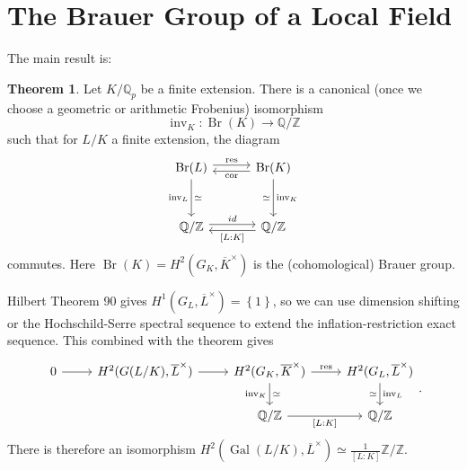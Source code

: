 \documentclass[class=article, crop=false]{standalone}
\newcommand{\ZZ}{\mathbb{Z}}
\newcommand{\QQ}{\mathbb{Q}}
\newcommand{\Gal}{\operatorname{Gal}}
\newcommand{\res}{\operatorname{res}}
\newcommand{\cor}{\operatorname{cor}}
\newcommand{\inv}{\operatorname{inv}}
\newcommand{\Br}{\operatorname{Br}}
\theoremstyle{definition}
\newtheorem{theorem}{Theorem}[section]
\begin{document}
\section{The Brauer Group of a Local Field}
The main result is:
\begin{theorem}
	Let $K/\QQ_p$ be a finite extension. There is a canonical (once we choose a geometric or arithmetic Frobenius) isomorphism
	\[
		\inv_K:\Br(K)\to\QQ/\ZZ
	\] 
	such that for $L/K$ a finite extension, the diagram
	\[
	\begin{tikzcd}[row sep=3em, column sep=3em]
		\Br(L)\ar[r,shift left,"\res"]\ar[d,swap,"\inv_L", "\simeq"'] & \Br(K)\ar[l,shift left,"\cor"]\ar[d,"\inv_K","\simeq"']\\
		\QQ/\ZZ\ar[r,shift left,"id"] & \QQ/\ZZ\ar[l,shift left,"{[L:K]}"]
	\end{tikzcd}
	\] 
	commutes. Here $\Br(K)=H^{2}(G_K,\overline{K}^{\times})$ is the (cohomological) Brauer group.
\end{theorem}
Hilbert Theorem 90 gives $H^{1}(G_L,\overline{L}^{\times})=\left\lbrace1\right\rbrace$, so we can use dimension shifting or the Hochschild-Serre spectral sequence to extend the inflation-restriction exact sequence. This combined with the theorem gives
\[
\begin{tikzcd}
	0\ar[r] & H^{2}(G(L/K),\overline{L}^{\times})\ar[r] & H^{2}(G_K,\overline{K}^{\times})\ar{r}{\res}\ar[d,"\inv_K"',"\simeq"] & H^{2}(G_L,\overline{L}^{\times})\ar[d,"\inv_L","\simeq"']\\
		& & \QQ/\ZZ\ar{r}[swap]{[L:K]} & \QQ/\ZZ
\end{tikzcd}
.\] 
There is therefore an isomorphism $H^{2}(\Gal(L/K),\overline{L}^{\times})\simeq\frac{1}{[L:K]}\ZZ/\ZZ$.\\
\end{document}
